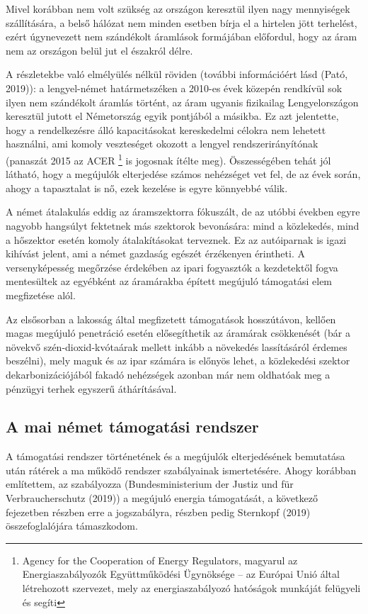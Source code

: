 \documentclass[twoside, magyar, showtrims]{corvinusphd}
\theoremstyle{plain}
\theoremstyle{remark}
\theoremstyle{definition}
\begin{document}
Mivel korábban nem volt szükség az országon
keresztül ilyen nagy mennyiségek szállítására,
a belső hálózat nem minden esetben
bírja el a hirtelen jött terhelést, ezért
úgynevezett nem szándékolt áramlások
formájában előfordul, hogy az áram nem
az országon belül jut el északról délre.

A részletekbe való elmélyülés nélkül röviden
(további információért lásd (Pató, 2019)):
a lengyel-német határmetszéken a 2010-es
évek közepén rendkívül sok ilyen nem szándékolt
áramlás történt, az áram ugyanis fizikailag
Lengyelországon keresztül jutott el
Németország egyik pontjából a másikba.
Ez azt jelentette, hogy a rendelkezésre álló
kapacitásokat kereskedelmi célokra nem lehetett
használni, ami komoly veszteséget okozott a lengyel
rendszerirányítónak (panaszát 2015 az
ACER \footnote{Agency for the Cooperation of Energy Regulators,
magyarul az Energiaszabályozók Együttműködési Ügynöksége
-- az Európai Unió által létrehozott szervezet, mely
az energiaszabályozó hatóságok munkáját felügyeli és segíti}
is jogosnak ítélte meg).
Összességében tehát jól látható,
hogy a megújulók elterjedése számos nehézséget
vet fel, de az évek során, ahogy a
tapasztalat is nő, ezek kezelése is egyre könnyebbé válik.

A német átalakulás eddig az áramszektorra fókuszált,
de az utóbbi években egyre nagyobb hangsúlyt
fektetnek más szektorok bevonására: mind a közlekedés,
mind a hőszektor esetén komoly
átalakításokat terveznek.
Ez az autóiparnak is igazi kihívást jelent,
ami a német gazdaság egészét érzékenyen érintheti.
A versenyképesség megőrzése érdekében
az ipari fogyasztók a kezdetektől fogva
mentesültek az egyébként az áramárakba
épített megújuló támogatási elem megfizetése alól.

Az elsősorban a lakosság által megfizetett támogatások hosszútávon,
kellően magas megújuló penetráció esetén elősegíthetik
az áramárak csökkenését (bár a növekvő szén-dioxid-kvótaárak mellett
inkább a növekedés lassításáról érdemes beszélni),
mely maguk és az ipar számára is előnyös lehet,
a közlekedési szektor dekarbonizációjából
fakadó nehézségek azonban már nem oldhatóak
meg a pénzügyi terhek egyszerű áthárításával.

\subsection{A mai német támogatási rendszer}

A támogatási rendszer történetének és
a megújulók elterjedésének bemutatása
után rátérek a ma működő rendszer
szabályainak ismertetésére. Ahogy korábban említettem,
az  szabályozza (Bundesministerium der Justiz und für Verbraucherschutz (2019))
a megújuló energia támogatását, a következő
fejezetben részben erre a jogszabályra, részben pedig Sternkopf (2019)
összefoglalójára támaszkodom.
\end{document}

